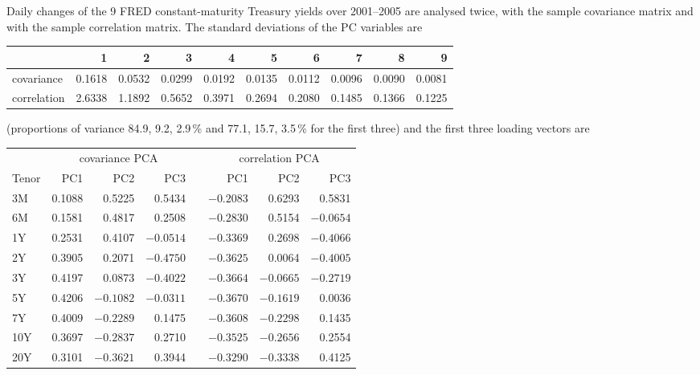 \begin{paracol}{2}
\begin{exercise}\label{ch07:ex-ps3}
Daily changes of the 9 FRED constant-maturity Treasury yields over 2001--2005 are analysed twice, with the sample
covariance matrix and with the sample correlation matrix. The standard deviations of the PC variables are
\begin{center}\small
\begin{tabular}{@{}l rrrrrrrrr@{}}
\toprule
 & 1 & 2 & 3 & 4 & 5 & 6 & 7 & 8 & 9\\
\midrule
covariance & 0.1618 & 0.0532 & 0.0299 & 0.0192 & 0.0135 & 0.0112 & 0.0096 & 0.0090 & 0.0081\\
correlation & 2.6338 & 1.1892 & 0.5652 & 0.3971 & 0.2694 & 0.2080 & 0.1485 & 0.1366 & 0.1225\\
\bottomrule
\end{tabular}
\end{center}
(proportions of variance 84.9, 9.2, 2.9\,\% and 77.1, 15.7, 3.5\,\% for the first three) and the first three loading
vectors are
\begin{center}\small
\begin{tabular}{@{}l rrr c rrr@{}}
\toprule
 & \multicolumn{3}{c}{covariance PCA} & & \multicolumn{3}{c}{correlation PCA}\\
\cmidrule(lr){2-4}\cmidrule(l){6-8}
Tenor & PC1 & PC2 & PC3 & & PC1 & PC2 & PC3\\
\midrule
3M  & 0.1088 & 0.5225 & 0.5434 & & $-0.2083$ & 0.6293 & 0.5831\\
6M  & 0.1581 & 0.4817 & 0.2508 & & $-0.2830$ & 0.5154 & $-0.0654$\\
1Y  & 0.2531 & 0.4107 & $-0.0514$ & & $-0.3369$ & 0.2698 & $-0.4066$\\
2Y  & 0.3905 & 0.2071 & $-0.4750$ & & $-0.3625$ & 0.0064 & $-0.4005$\\
3Y  & 0.4197 & 0.0873 & $-0.4022$ & & $-0.3664$ & $-0.0665$ & $-0.2719$\\
5Y  & 0.4206 & $-0.1082$ & $-0.0311$ & & $-0.3670$ & $-0.1619$ & 0.0036\\
7Y  & 0.4009 & $-0.2289$ & 0.1475 & & $-0.3608$ & $-0.2298$ & 0.1435\\
10Y & 0.3697 & $-0.2837$ & 0.2710 & & $-0.3525$ & $-0.2656$ & 0.2554\\
20Y & 0.3101 & $-0.3621$ & 0.3944 & & $-0.3290$ & $-0.3338$ & 0.4125\\
\bottomrule
\end{tabular}
\end{center}

\end{exercise}
\end{paracol}
